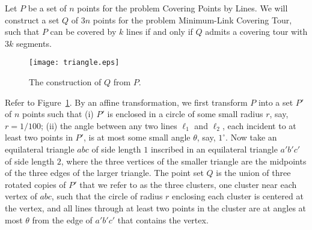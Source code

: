 \documentclass[letterpaper,11pt]{article}
\begin{document}
Let $P$ be a set of $n$ points for the problem {\sc Covering Points by Lines}.
We will construct a set $Q$ of $3n$ points for the problem
{\sc Minimum-Link Covering Tour},
such that $P$ can be covered by $k$ lines if and only if
$Q$ admits a covering tour with $3k$ segments.

\begin{figure}[htb]
\centering\texttt{[image: triangle.eps]}
\caption{The construction of $Q$ from $P$.}
\label{fig:triangle}
\end{figure}

Refer to Figure~\ref{fig:triangle}.
By an affine transformation, we first transform $P$
into a set $P'$ of $n$ points such that
(i) $P'$ is enclosed in a circle of some small radius $r$, say, $r = 1/100$;
(ii) the angle between any two lines $\ell_1$ and $\ell_2$,
each incident to at least two points in $P'$,
is at most some small angle $\theta$, say, $1^\circ$.
Now take an equilateral triangle $abc$ of side length $1$ inscribed
in an equilateral triangle $a'b'c'$ of side length $2$,
where the three vertices of the smaller triangle are the midpoints of
the three edges of the larger triangle.
The point set $Q$ is the union of three rotated copies of $P'$ that we refer
to as the three clusters,
one cluster near each vertex of $abc$,
such that the circle of radius $r$ enclosing each cluster is centered
at the vertex,
and all lines through at least two points in the cluster are at angles at most
$\theta$ from the edge of $a'b'c'$ that contains the vertex.
\end{document}
